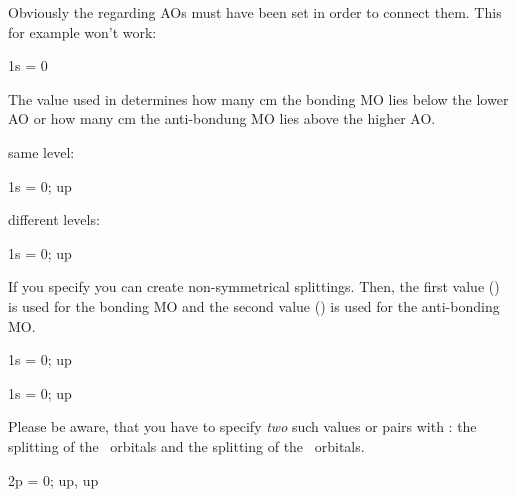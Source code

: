 \documentclass[load-preamble+]{cnltx-doc}
\begin{document}
Obviously the regarding \acp{AO} must have been set in order to connect them.
This for example won't work:
\begin{sourcecode}
  \begin{MOdiagram} 
     { 1s = 0 }
  \end{MOdiagram}
\end{sourcecode}
The value used in  determines how many \si{\centi\metre} the
bonding \ac{MO} lies below the lower \ac{AO} or how many \si{\centi\metre} the
anti-bondung \ac{MO} lies above the higher \ac{AO}.

\begin{example}
  same level:\par
  \begin{MOdiagram}
     { 1s = {  0; up } }
  \end{MOdiagram}

  different levels:\par
  \begin{MOdiagram}
     { 1s = {  0; up } }
  \end{MOdiagram}
\end{example}

If you specify  you can create non-symmetrical splittings.
Then, the first value () is used for the bonding \ac{MO} and
the second value () is used for the anti-bonding \ac{MO}.
\begin{example}
  \begin{MOdiagram}
     { 1s = {  0; up } }
  \end{MOdiagram}

  \begin{MOdiagram}
     { 1s = {  0; up } }
  \end{MOdiagram}
\end{example}

Please be aware, that you have to specify \emph{two} such values or pairs with
: the splitting of the \chemsigma\ orbitals and the splitting of
the \chempi\ orbitals.
\begin{example}
  \begin{MOdiagram}
     { 2p = { 0; up, up } }
  \end{MOdiagram}
\end{example}
\end{document}
